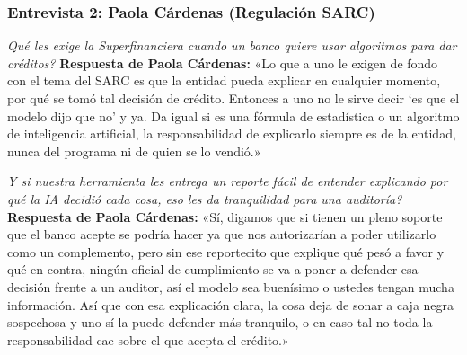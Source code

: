 \documentclass[11pt,a4paper]{article}
\begin{document}
\subsubsection{Entrevista 2: Paola C\'ardenas (Regulaci\'on SARC)}

\begin{tcolorbox}[colback=lightgray,colframe=secondary,title={\textbf{Pregunta 1: Exigencias de la Superfinanciera sobre algoritmos}}]
\textit{\textquestiondown Qu\'e les exige la Superfinanciera cuando un banco quiere usar algoritmos para dar cr\'editos?}
\tcblower
\textbf{Respuesta de Paola C\'ardenas:}  
«Lo que a uno le exigen de fondo con el tema del SARC es que la entidad pueda explicar en cualquier momento, por qu\'e se tom\'o tal decisi\'on de cr\'edito. Entonces a uno no le sirve decir `es que el modelo dijo que no' y ya. Da igual si es una f\'ormula de estad\'istica o un algoritmo de inteligencia artificial, la responsabilidad de explicarlo siempre es de la entidad, nunca del programa ni de quien se lo vendi\'o.»
\end{tcolorbox}

\begin{tcolorbox}[colback=lightgray,colframe=secondary,title={\textbf{Pregunta 2: Utilidad de un reporte explicativo para auditor\'ias}}]
\textit{\textquestiondown Y si nuestra herramienta les entrega un reporte f\'acil de entender explicando por qu\'e la IA decidi\'o cada cosa, eso les da tranquilidad para una auditor\'ia?}
\tcblower
\textbf{Respuesta de Paola C\'ardenas:}  
«S\'i, digamos que si tienen un pleno soporte que el banco acepte se podr\'ia hacer ya que nos autorizar\'ian a poder utilizarlo como un complemento, pero sin ese reportecito que explique qu\'e pes\'o a favor y qu\'e en contra, ning\'un oficial de cumplimiento se va a poner a defender esa decisi\'on frente a un auditor, as\'i el modelo sea buen\'isimo o ustedes tengan mucha informaci\'on. As\'i que con esa explicaci\'on clara, la cosa deja de sonar a caja negra sospechosa y uno s\'i la puede defender m\'as tranquilo, o en caso tal no toda la responsabilidad cae sobre el que acepta el cr\'edito.»
\end{tcolorbox}
\end{document}
